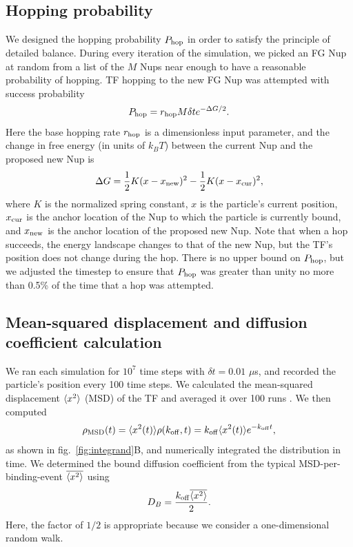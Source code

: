 \subsection{Hopping probability}

We designed the hopping probability $P_{\rm hop}$ in order to satisfy the principle of detailed balance.  During every iteration of the simulation, we picked an FG Nup at random from a list of the $M$  Nups near enough to have a reasonable probability of hopping. TF hopping to the new FG Nup was attempted with success probability
\begin{equation}
P_{\rm hop} = r_{\mathrm{hop}} M \delta t e^{-\Delta G /2}.
\end{equation}
Here the base hopping rate $r_{\mathrm{hop}}$ is a dimensionless input parameter, and the change in free energy (in units of $k_BT$) between the current Nup and the proposed new Nup is
\begin{equation}
  \Delta G = \frac{1}{2} K (x-x_{\mathrm{new}})^2 - \frac{1}{2} K (x -
  x_{\mathrm{cur}})^2,
\end{equation}
where $K$ is the normalized spring constant, $x$ is the particle's current position, $x_{\mathrm{cur}}$ is the anchor location of the Nup to which the particle is currently bound, and $x_{\mathrm{new}}$ is the anchor location of the proposed new Nup. Note that when a hop succeeds, the energy landscape changes to that of the new Nup, but the TF's position does not change during the hop.  There is no upper bound on $P_{\rm hop}$, but we adjusted the timestep to ensure that $P_{\rm hop}$ was greater than
unity no more than 0.5\% of the time that a hop was attempted.

\subsection{Mean-squared displacement and diffusion coefficient calculation}
We ran each simulation for $10^7$ time steps with $\delta t = 0.01$ $\mu$s, and recorded the particle's position every 100 time steps.  We calculated the mean-squared displacement $\langle x^2 \rangle$ (MSD) of the TF and averaged it over 100 runs .  We then computed
\begin{equation}
\rho_{\mathrm{MSD}} (t)= \langle x^2(t) \rangle \rho(k_{\rm off},t) = k_{\rm off} \langle x^2(t) \rangle
e^{-k_{\rm off} t}, 
\end{equation}
as shown in fig.~\ref{fig:integrand}B, and numerically integrated the distribution in time. We determined the bound diffusion coefficient from the typical MSD-per-binding-event $\overline{\langle x^2 \rangle}$ using
\begin{equation}
D_B = \frac{k_{\rm off} \overline{\langle x^2 \rangle}}{2}. 
\end{equation}   
Here, the factor of $1/2$ is appropriate because we consider a one-dimensional random walk.

